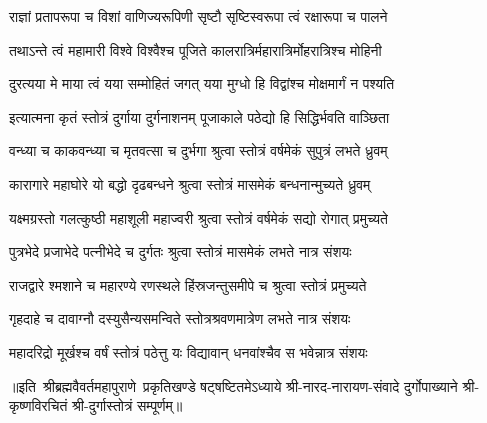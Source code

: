 \twolineshloka
{राज्ञां प्रतापरूपा च विशां वाणिज्यरूपिणी}
{सृष्टौ सृष्टिस्वरूपा त्वं रक्षारूपा च पालने}

\twolineshloka
{तथाऽन्ते त्वं महामारी विश्वे विश्वैश्च पूजिते}
{कालरात्रिर्महारात्रिर्मोहरात्रिश्च मोहिनी}

\twolineshloka
{दुरत्यया मे माया त्वं यया सम्मोहितं जगत्}
{यया मुग्धो हि विद्वांश्च मोक्षमार्गं न पश्यति}


\twolineshloka
{इत्यात्मना कृतं स्तोत्रं दुर्गाया दुर्गनाशनम्}
{पूजाकाले पठेद्यो हि सिद्धिर्भवति वाञ्छिता}

\twolineshloka
{वन्ध्या च काकवन्ध्या च मृतवत्सा च दुर्भगा}
{श्रुत्वा स्तोत्रं वर्षमेकं सुपुत्रं लभते ध्रुवम्}

\twolineshloka
{कारागारे महाघोरे यो बद्धो दृढबन्धने}
{श्रुत्वा स्तोत्रं मासमेकं बन्धनान्मुच्यते ध्रुवम्}

\twolineshloka
{यक्ष्मग्रस्तो गलत्कुष्ठी महाशूली महाज्वरी}
{श्रुत्वा स्तोत्रं वर्षमेकं सद्यो रोगात् प्रमुच्यते}

\twolineshloka
{पुत्रभेदे प्रजाभेदे पत्‍‌नीभेदे च दुर्गतः}
{श्रुत्वा स्तोत्रं मासमेकं लभते नात्र संशयः}

\twolineshloka
{राजद्वारे श्मशाने च महारण्ये रणस्थले}
{हिंस्रजन्तुसमीपे च श्रुत्वा स्तोत्रं प्रमुच्यते}

\twolineshloka
{गृहदाहे च दावाग्नौ दस्युसैन्यसमन्विते}
{स्तोत्रश्रवणमात्रेण लभते नात्र संशयः}

\twolineshloka
{महादरिद्रो मूर्खश्च वर्षं स्तोत्रं पठेत्तु यः}
{विद्यावान् धनवांश्चैव स भवेन्नात्र संशयः}

{॥इति~श्रीब्रह्मवैवर्तमहापुराणे~प्रकृतिखण्डे षट्षष्टितमेऽध्याये श्री-नारद-नारायण-संवादे दुर्गोपाख्याने श्री-कृष्णविरचितं श्री-दुर्गास्तोत्रं सम्पूर्णम्॥}